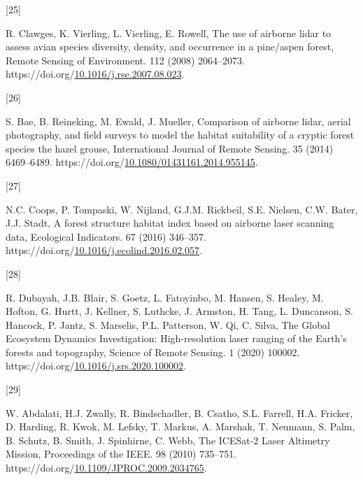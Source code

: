 \documentclass[manuscript, 3p, authoryear]{elsarticle} %
\newlength{\cslhangindent}
\newlength{\csllabelwidth}
\newlength{\cslentryspacingunit} %
\newenvironment{CSLReferences}[2] %
 {%
  \setlength{\parindent}{0pt}
  \ifodd #1
  \let\oldpar\par
  \def\par{\hangindent=\cslhangindent\oldpar}
  \fi
  \setlength{\parskip}{#2\cslentryspacingunit}
 }%
 {}
\newcommand{\CSLLeftMargin}[1]{\parbox[t]{\csllabelwidth}{#1}}
\newcommand{\CSLRightInline}[1]{\parbox[t]{\linewidth - \csllabelwidth}{#1}\break}
\begin{document}
\begin{CSLReferences}{0}{0}
\leavevmode{}%
\CSLLeftMargin{{[}25{]} }%
\CSLRightInline{R. Clawges, K. Vierling, L. Vierling, E. Rowell, The use of airborne lidar to assess avian species diversity, density, and occurrence in a pine/aspen forest, Remote Sensing of Environment. 112 (2008) 2064--2073. https://doi.org/\href{https://doi.org/10.1016/j.rse.2007.08.023}{10.1016/j.rse.2007.08.023}.}

\leavevmode{}%
\CSLLeftMargin{{[}26{]} }%
\CSLRightInline{S. Bae, B. Reineking, M. Ewald, J. Mueller, Comparison of airborne lidar, aerial photography, and field surveys to model the habitat suitability of a cryptic forest species \textendash{} the hazel grouse, International Journal of Remote Sensing. 35 (2014) 6469--6489. https://doi.org/\href{https://doi.org/10.1080/01431161.2014.955145}{10.1080/01431161.2014.955145}.}

\leavevmode{}%
\CSLLeftMargin{{[}27{]} }%
\CSLRightInline{N.C. Coops, P. Tompaski, W. Nijland, G.J.M. Rickbeil, S.E. Nielsen, C.W. Bater, J.J. Stadt, A forest structure habitat index based on airborne laser scanning data, Ecological Indicators. 67 (2016) 346--357. https://doi.org/\href{https://doi.org/10.1016/j.ecolind.2016.02.057}{10.1016/j.ecolind.2016.02.057}.}

\leavevmode{}%
\CSLLeftMargin{{[}28{]} }%
\CSLRightInline{R. Dubayah, J.B. Blair, S. Goetz, L. Fatoyinbo, M. Hansen, S. Healey, M. Hofton, G. Hurtt, J. Kellner, S. Luthcke, J. Armston, H. Tang, L. Duncanson, S. Hancock, P. Jantz, S. Marselis, P.L. Patterson, W. Qi, C. Silva, The {Global Ecosystem Dynamics Investigation}: {High-resolution} laser ranging of the {Earth}'s forests and topography, Science of Remote Sensing. 1 (2020) 100002. https://doi.org/\href{https://doi.org/10.1016/j.srs.2020.100002}{10.1016/j.srs.2020.100002}.}

\leavevmode{}%
\CSLLeftMargin{{[}29{]} }%
\CSLRightInline{W. Abdalati, H.J. Zwally, R. Bindschadler, B. Csatho, S.L. Farrell, H.A. Fricker, D. Harding, R. Kwok, M. Lefsky, T. Markus, A. Marshak, T. Neumann, S. Palm, B. Schutz, B. Smith, J. Spinhirne, C. Webb, The {ICESat-2 Laser Altimetry Mission}, Proceedings of the IEEE. 98 (2010) 735--751. https://doi.org/\href{https://doi.org/10.1109/JPROC.2009.2034765}{10.1109/JPROC.2009.2034765}.}


\end{CSLReferences}
\end{document}
